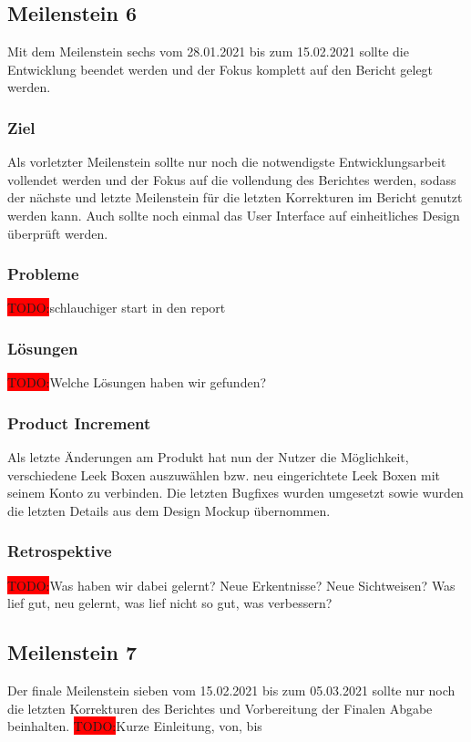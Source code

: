 \documentclass[10pt, a4paper, draft]{article}
\begin{document}
\subsection{Meilenstein 6}
Mit dem Meilenstein sechs vom 28.01.2021 bis zum 15.02.2021 sollte die Entwicklung beendet werden und der Fokus komplett auf den Bericht gelegt werden.
\subsubsection{Ziel}
Als vorletzter Meilenstein sollte nur noch die notwendigste Entwicklungsarbeit vollendet werden und der Fokus auf die vollendung des Berichtes werden, sodass der nächste und letzte Meilenstein für die letzten Korrekturen im Bericht genutzt werden kann.
Auch sollte noch einmal das User Interface auf einheitliches Design überprüft werden.
\subsubsection{Probleme}
\colorbox{red}{TODO:}schlauchiger start in den report

\subsubsection{Lösungen}
\colorbox{red}{TODO:}Welche Lösungen haben wir gefunden?

\subsubsection{Product Increment}
Als letzte Änderungen am Produkt hat nun der Nutzer die Möglichkeit, verschiedene Leek Boxen auszuwählen bzw. neu eingerichtete Leek Boxen mit seinem Konto zu verbinden.
Die letzten Bugfixes wurden umgesetzt sowie wurden die letzten Details aus dem Design Mockup übernommen.
\subsubsection{Retrospektive}
\colorbox{red}{TODO:}Was haben wir dabei gelernt? Neue Erkentnisse? Neue Sichtweisen?
Was lief gut, neu gelernt, was lief nicht so gut, was verbessern?

\subsection{Meilenstein 7}
Der finale Meilenstein sieben vom 15.02.2021 bis zum 05.03.2021 sollte nur noch die letzten Korrekturen des Berichtes und Vorbereitung der Finalen Abgabe beinhalten.
\colorbox{red}{TODO:}Kurze Einleitung, von, bis
\end{document}
